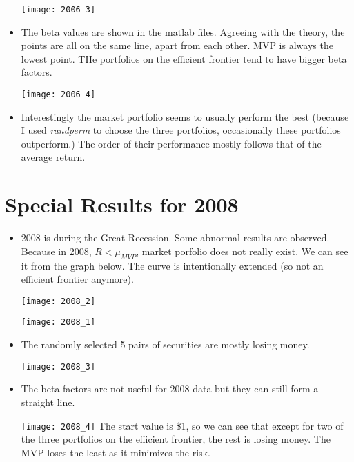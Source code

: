 \documentclass{article}
\begin{document}
\begin{itemize}
\texttt{[image: 2006\_3]}
\item The beta values are shown in the matlab files. Agreeing with the theory, the points are all on the same line, apart from each other. MVP is always the lowest point. THe portfolios on the efficient frontier tend to have bigger beta factors. 

\texttt{[image: 2006\_4]}
\item Interestingly the market portfolio seems to usually perform the best (because I used \textit{randperm} to choose the three portfolios, occasionally these portfolios outperform.) The order of their performance mostly follows that of the average return.


 \end{itemize}

\section{Special Results for 2008}
\begin{itemize}
\item 2008 is during the Great Recession. Some abnormal results are observed. Because in 2008, $R<\mu_{MVP}$, market porfolio does not really exist. We can see it from the graph below. The curve is  intentionally extended (so not an efficient frontier anymore). 

\texttt{[image: 2008\_2]}

\texttt{[image: 2008\_1]}
\item The randomly selected 5 pairs of securities are mostly losing money.

\texttt{[image: 2008\_3]}

\item The beta factors are not useful for 2008 data but they can still form a straight line.

\texttt{[image: 2008\_4]}
The start value is \$1, so we can see that except for two of the three portfolios on the efficient frontier, the rest is losing money. The MVP loses the least as it minimizes the risk.
 \end{itemize}
\end{document}

